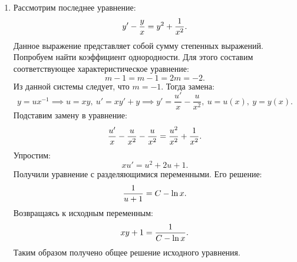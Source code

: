 \begin{enumerate}
			\item Рассмотрим последнее уравнение:
				\[ y' - \frac{y}{x} = y^2 + \frac{1}{x^2}. \]
				Данное выражение представляет собой сумму степенных выражений. Попробуем найти коэффициент однородности. Для этого составим соответствующее характеристическое уравнение:
				\[ m - 1 = m - 1 = 2m = -2. \]
				Из данной системы следует, что $m = -1$.
				Тогда замена:
				\[ y = ux^{-1} \implies u = xy, ~ u' = xy' + y \implies y' = \frac{u'}{x} - \frac{u}{x^2}, ~ u = u(x), ~ y = y(x). \]
				Подставим замену в уравнение:
				\[ \frac{u'}{x} - \frac{u}{x^2} - \frac{u}{x^2} = \frac{u^2}{x^2} + \frac{1}{x^2}. \]
				Упростим:
				\[ xu' = u^2 + 2u + 1. \]
				Получили уравнение с разделяющимися переменными. Его решение:
				\[ \frac{1}{u + 1} = C - \ln{x}. \]
				Возвращаясь к исходным переменным:
				\[ xy + 1 = \frac{1}{C - \ln{x}}. \]
				Таким образом получено общее решение исходного уравнения.
				
		\end{enumerate}
